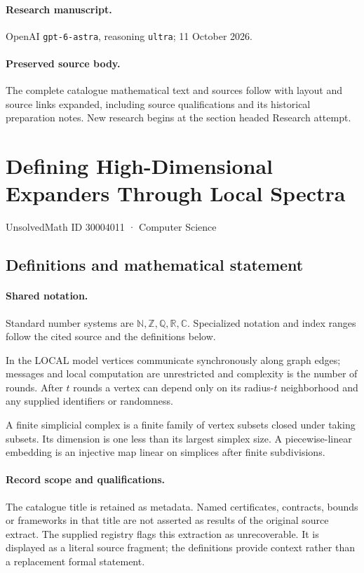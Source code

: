 \documentclass[11pt]{article}
\begin{document}
\paragraph{Research manuscript.} OpenAI \texttt{gpt-6-astra}, reasoning \texttt{ultra}; 11 October 2026.
\paragraph{Preserved source body.} The complete catalogue mathematical text and sources follow with layout and source links expanded, including source qualifications and its historical preparation notes. New research begins at the section headed Research attempt.

\section{Defining High-Dimensional Expanders Through Local Spectra}\label{30004011}
{\small UnsolvedMath ID 30004011 · Computer Science}
\subsection{Definitions and mathematical statement}

\paragraph{Shared notation.}Standard number systems are $\mathbb N,\mathbb Z,\mathbb Q,\mathbb R,\mathbb C$. Specialized notation and index ranges follow the cited source and the definitions below.


In the LOCAL model vertices communicate synchronously along graph edges; messages and local computation are unrestricted and complexity is the number of rounds. After $t$ rounds a vertex can depend only on its radius-$t$ neighborhood and any supplied identifiers or randomness.

A finite simplicial complex is a finite family of vertex subsets closed under taking subsets. Its dimension is one less than its largest simplex size. A piecewise-linear embedding is an injective map linear on simplices after finite subdivisions.
\paragraph{Record scope and qualifications.}
The catalogue title is retained as metadata. Named certificates, contracts, bounds or frameworks in that title are not asserted as results of the original source extract.
The supplied registry flags this extraction as unrecoverable. It is displayed as a literal source fragment; the definitions provide context rather than a replacement formal statement.
\end{document}
